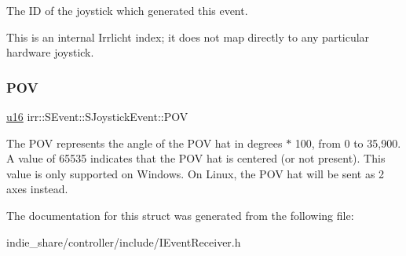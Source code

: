 The ID of the joystick which generated this event. 

This is an internal Irrlicht index; it does not map directly to any particular hardware joystick. \mbox{\label{structirr_1_1SEvent_1_1SJoystickEvent_af30285332d154507b9752ffde3f6bf84}} 
\subsubsection{\texorpdfstring{P\+OV}{POV}}
{\footnotesize\ttfamily \hyperlink{namespaceirr_ae9f8ec82692ad3b83c21f555bfa70bcc}{u16} irr\+::\+S\+Event\+::\+S\+Joystick\+Event\+::\+P\+OV}

The P\+OV represents the angle of the P\+OV hat in degrees $\ast$ 100, from 0 to 35,900. A value of 65535 indicates that the P\+OV hat is centered (or not present). This value is only supported on Windows. On Linux, the P\+OV hat will be sent as 2 axes instead. 

The documentation for this struct was generated from the following file\+:\begin{DoxyCompactItemize}
\item 
indie\+\_\+share/controller/include/I\+Event\+Receiver.\+h\end{DoxyCompactItemize}
